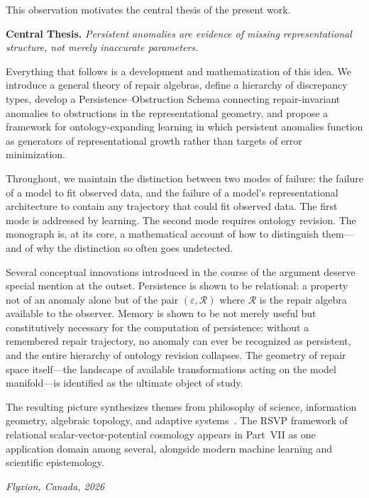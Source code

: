 \documentclass[12pt,oneside]{book}
\theoremstyle{plain}
\theoremstyle{definition}
\theoremstyle{remark}
\newcommand{\R}{\mathcal{R}}
\newcommand{\eps}{\varepsilon}
\newcommand{\1}{\mathbf{1}}
\begin{document}
This observation motivates the central thesis of the present work.

\medskip
\noindent\textbf{Central Thesis.} \emph{Persistent anomalies are evidence of missing representational structure, not merely inaccurate parameters.}
\medskip

Everything that follows is a development and mathematization of this idea. We introduce a general theory of repair algebras, define a hierarchy of discrepancy types, develop a Persistence--Obstruction Schema connecting repair-invariant anomalies to obstructions in the representational geometry, and propose a framework for ontology-expanding learning in which persistent anomalies function as generators of representational growth rather than targets of error minimization.

Throughout, we maintain the distinction between two modes of failure: the failure of a model to fit observed data, and the failure of a model's representational architecture to contain any trajectory that could fit observed data. The first mode is addressed by learning. The second mode requires ontology revision. The monograph is, at its core, a mathematical account of how to distinguish them---and of why the distinction so often goes undetected.

Several conceptual innovations introduced in the course of the argument deserve special mention at the outset. Persistence is shown to be relational: a property not of an anomaly alone but of the pair $(\eps, \R)$ where $\R$ is the repair algebra available to the observer. Memory is shown to be not merely useful but constitutively necessary for the computation of persistence: without a remembered repair trajectory, no anomaly can ever be recognized as persistent, and the entire hierarchy of ontology revision collapses. The geometry of repair space itself---the landscape of available transformations acting on the model manifold---is identified as the ultimate object of study.

The resulting picture synthesizes themes from philosophy of science, information geometry, algebraic topology, and adaptive systems~\cite{kuhn1962,amari2016,hatcher2002,friston2010}. The RSVP framework of relational scalar-vector-potential cosmology appears in Part~VII as one application domain among several, alongside modern machine learning and scientific epistemology.

\vspace{1em}
\noindent\textit{Flyxion, Canada, 2026}

\mainmatter
\end{document}
